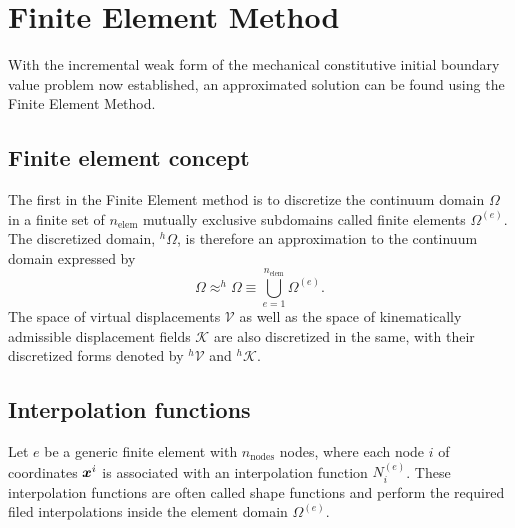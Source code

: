 \section{Finite Element Method} \label{sec:fem}

With the incremental weak form of the mechanical constitutive initial boundary value problem now established, an approximated solution can be found using the Finite Element Method.

\subsection{Finite element concept}

The first in the Finite Element method is to discretize the continuum domain $\Omega$ in a finite set of $n_\text{elem}$ mutually exclusive subdomains called finite elements $\Omega^{(e)}$.
The discretized domain, $^h\Omega$, is therefore an approximation to the continuum domain expressed by
\begin{equation}
    \Omega \approx ^h\Omega \equiv \bigcup_{e=1}^{n_\text{elem}}\Omega^{(e)}.
\end{equation}
The space of virtual displacements $\mathscr{V}$ as well as the space of kinematically admissible displacement fields $\mathscr{K}$ are also discretized in the same, with their discretized forms denoted by $^h\mathscr{V}$ and $^h\mathscr{K}$.

\subsection{Interpolation functions}

Let $e$ be a generic finite element with $n_\text{nodes}$ nodes, where each node $i$ of coordinates $\bm{x}^i$ is associated with an interpolation function $N_i^{(e)}$.
These interpolation functions are often called shape functions and perform the required filed interpolations inside the element domain $\Omega^{(e)}$.

